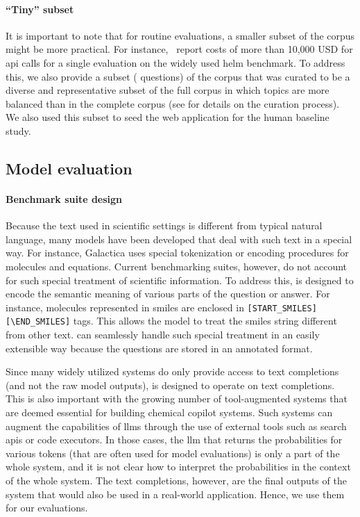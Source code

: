 \documentclass[11pt, oneside]{article}
\begin{document}
\begin{refsection}
\paragraph{\enquote{Tiny} subset}
It is important to note that for routine evaluations, a smaller subset of the corpus might be more practical.\autocite{polo2024tinybenchmarks}
For instance,~\textcite{liang2023holistic} report costs of more than 10,000 USD for \gls{api} calls for a single evaluation on the widely used \gls{helm} benchmark. 
To address this, we also provide a subset ( questions) of the corpus that was curated to be a diverse and representative subset of the full corpus in which topics are more balanced than in the complete corpus (see  for details on the curation process).
We also used this subset to seed the web application for the human baseline study. 



\subsection{Model evaluation}

\paragraph{Benchmark suite design} Because the text used in scientific settings is different from typical natural language, many models have been developed that deal with such text in a special way.
For instance, Galactica\autocite{taylor2022galactica} uses special tokenization or encoding procedures for molecules and equations. 
Current benchmarking suites, however, do not account for such special treatment of scientific information.
To address this, \chembench is designed to encode the semantic meaning of various parts of the question or answer.  
For instance, molecules represented in \gls{smiles} are enclosed in \texttt{[START\_SMILES][\textbackslash END\_SMILES]} tags. 
This allows the model to treat the \gls{smiles} string different from other text. 
\chembench can seamlessly handle such special treatment in an easily extensible way because the questions are stored in an annotated format.

Since many widely utilized systems do only provide access to text completions (and not the raw model outputs), \chembench is designed to operate on text completions.
This is also important with the growing number of tool-augmented systems that are deemed essential for building chemical copilot systems. 
Such systems can augment the capabilities of \glspl{llm} through the use of external tools such as search \glspl{api} or code executors.\autocite{schick2024toolformer, karpas2022mrkl, yao2022react}
In those cases, the \gls{llm} that returns the probabilities for various tokens (that are often used for model evaluations\autocite{Fourrier_Habib_Launay_Wolf}) is only a part of the whole system, and it is not clear how to interpret the probabilities in the context of the whole system.
The text completions, however, are the final outputs of the system that would also be used in a real-world application. Hence, we use them for our evaluations.


\end{refsection}
\end{document}

